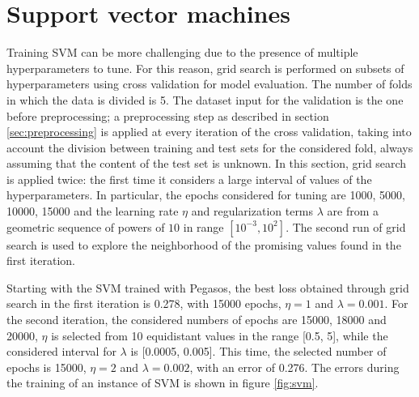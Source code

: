 \documentclass{article}
\begin{document}
\section{Support vector machines}
Training SVM can be more challenging due to the presence of multiple hyperparameters to tune.
For this reason, grid search is performed on subsets of hyperparameters using cross validation for model evaluation. The number of folds in which the data is divided is 5. 
The dataset input for the validation is the one before preprocessing; a preprocessing step as described in section \ref{sec:preprocessing} is applied at every iteration of the cross validation, taking into account the division between training and test sets for the considered fold, always assuming that the content of the test set is unknown. 
In this section, grid search is applied twice: the first time it considers a large interval of values of the hyperparameters. In particular, the epochs considered for tuning are 1000, 5000, 10000, 15000 and the learning rate $\eta$ and regularization terms $\lambda$ are from a geometric sequence of powers of $10$ in range $[10^{-3}, 10^2]$. 
The second run of grid search is used to explore the neighborhood of the promising values found in the first iteration.

Starting with the SVM trained with Pegasos, the best loss obtained through grid search in the first iteration is 0.278, with 15000 epochs, $\eta=1$ and $\lambda=0.001$. 
For the second iteration, the considered numbers of epochs are 15000, 18000 and 20000, $\eta$ is selected from 10 equidistant values in the range [0.5, 5], while the considered interval for $\lambda$ is [0.0005, 0.005]. 
This time, the selected number of epochs is 15000, $\eta=2$ and $\lambda=0.002$, with an error of 0.276. The errors during the training of an instance of SVM is shown in figure \ref{fig:svm}.
\end{document}
